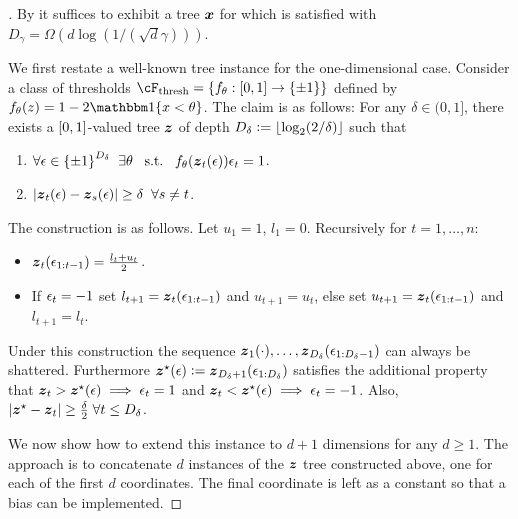 \begin{proof}[]
By  it suffices to exhibit a tree $\mb{x}$ for which  is satisfied with $D_{\gamma}=\Omega(d\log(1/(\sqrt{d}\gamma)))$.

We first restate a well-known tree instance for the one-dimensional case. Consider a class of thresholds $\cF_{\textrm{thresh}}=\crl*{f_{\theta}:\brk*{0,1}\to\pmo}$ defined by $f_{\theta}(z)=1-2\ind\crl*{x<\theta}$. The claim is as follows: For any $\delta\in(0,1]$, there exists a $\brk*{0,1}$-valued tree $\mb{z}$ of depth $D_{\delta}\ldef\floor*{\log_{2}(2/\delta)}$ such that
\begin{enumerate}
\item 
$\forall{}\eps\in\pmo^{D_{\delta}}\;\;\exists{}\theta\;\;\;\textrm{s.t.}\;\;\; f_{\theta}(\mb{z}_t(\eps))\eps_{t}=1$.
\item $\abs*{\mb{z}_t(\eps) - \mb{z}_s(\eps)}\geq{}\delta\;\;\forall{}s\neq{}t$.
\end{enumerate}
The construction is as follows. Let $u_{1}=1$, $l_1=0$. Recursively for $t=1,\ldots,n$:
\begin{itemize}
\item $\mb{z}_{t}(\eps_{1:t-1})=\frac{l_t + u_t}{2}$. 
\item If $\eps_t=-1$ set $l_{t+1}=\mb{z}_t(\eps_{1:t-1})$ and $u_{t+1}=u_t$, else set $u_{t+1}=\mb{z}_t(\eps_{1:t-1})$ and $l_{t+1}=l_t$.
\end{itemize}
Under this construction the sequence $\mb{z}_1(\cdot),\ldots, \mb{z}_{D_{\delta}}(\eps_{1:D_{\delta}-1})$ can always be shattered. Furthermore $\mb{z}^{\star}(\eps)\ldef\mb{z}_{D_{\delta}+1}(\eps_{1:D_{\delta}})$ satisfies the additional property that $\mb{z}_t>\mb{z}^{\star}(\eps)\implies{}\eps_t=1$ and $\mb{z}_t<\mb{z}^{\star}(\eps)\implies\eps_t=-1$. Also, $\abs*{\mb{z}^{\star}-\mb{z}_t}\geq\frac{\delta}{2}\;\forall{}t\leq{}D_{\delta}$.

We now show how to extend this instance to $d+1$ dimensions for any $d\geq{}1$. The approach is to concatenate $d$ instances of the $\mb{z}$ tree constructed above, one for each of the first $d$ coordinates. The final coordinate is left as a constant so that a bias can be implemented.


\end{proof}
